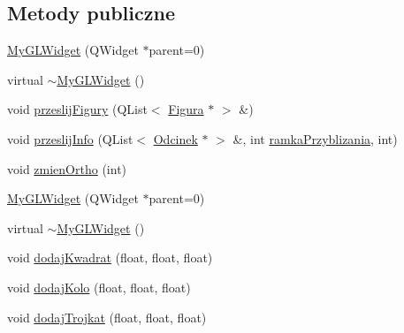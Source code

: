\subsection*{Metody publiczne}
\begin{DoxyCompactItemize}
\item 
\hyperlink{classMyGLWidget_a2b3f2523eae378b2a4a5f66bd176be57}{My\-G\-L\-Widget} (Q\-Widget $\ast$parent=0)
\item 
virtual \hyperlink{classMyGLWidget_aefac459d382b61ea5589ff6269ecdf73}{$\sim$\-My\-G\-L\-Widget} ()
\item 
void \hyperlink{classMyGLWidget_af0ec25e9dee6351a690c26a392cde121}{przeslij\-Figury} (Q\-List$<$ \hyperlink{classFigura}{Figura} $\ast$ $>$ \&)
\item 
void \hyperlink{classMyGLWidget_a23624367d20ad8ca6a09f283ccb92c31}{przeslij\-Info} (Q\-List$<$ \hyperlink{classOdcinek}{Odcinek} $\ast$ $>$ \&, int \hyperlink{classMyGLWidget_ae1dab2275c515885d170d48a682d1943}{ramka\-Przyblizania}, int)
\item 
void \hyperlink{classMyGLWidget_a3cecbb2f5658f148e6e5d8ef3a3cc5e5}{zmien\-Ortho} (int)
\item 
\hyperlink{classMyGLWidget_a2b3f2523eae378b2a4a5f66bd176be57}{My\-G\-L\-Widget} (Q\-Widget $\ast$parent=0)
\item 
virtual \hyperlink{classMyGLWidget_a5ae6fab157bceedb032e074f519b9ad2}{$\sim$\-My\-G\-L\-Widget} ()
\item 
void \hyperlink{classMyGLWidget_a9859c9d91ca7457eadf69262c5b2766f}{dodaj\-Kwadrat} (float, float, float)
\item 
void \hyperlink{classMyGLWidget_a09ca4dbb3bb5714f5bf0dd531c7d5db9}{dodaj\-Kolo} (float, float, float)
\item 
void \hyperlink{classMyGLWidget_a35509c8dc1d449238eb960cc71c05204}{dodaj\-Trojkat} (float, float, float)
\end{DoxyCompactItemize}
